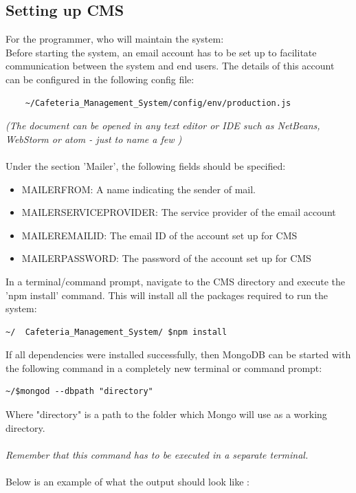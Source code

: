 \documentclass[a4paper,12pt]{report}
\begin{document}
\subsection{Setting up CMS}
For the programmer, who will maintain the system: \\
Before starting the system, an email account has to be set up to facilitate communication between the system and end users. The details of this account can be configured in the following config file:
\begin{verbatim}
	~/Cafeteria_Management_System/config/env/production.js
\end{verbatim} 
{\em (The document can be opened in any text editor or IDE  such as NetBeans, WebStorm or atom - just to name a few )}
\\ \\
Under the section 'Mailer', the following fields should be specified:\\
\begin{itemize}
\item MAILER\textunderscore FROM: A name indicating the sender of mail.
\item MAILER\textunderscore SERVICE\textunderscore PROVIDER: The service provider of the email account
\item MAILER\textunderscore EMAIL\textunderscore ID: The email ID of the account set up for CMS
\item MAILER\textunderscore PASSWORD: The password of the account set up for CMS
\end{itemize}


In a terminal/command prompt, navigate to the CMS directory and execute the 'npm install' command. This will install all the packages required to run the system: 


\begin{verbatim}
~/  Cafeteria_Management_System/ $npm install
\end{verbatim}

If all dependencies were installed successfully, then MongoDB can be started with the following command in a completely new terminal or command prompt:
\begin{verbatim}
~/$mongod --dbpath "directory"
\end{verbatim}

Where "directory"  is a path to the folder which Mongo will use as a working directory.\\ \\
{\em Remember that this command has to be executed in a separate terminal.}\\ \\
Below is an example of what the output should look like :
\end{document}
